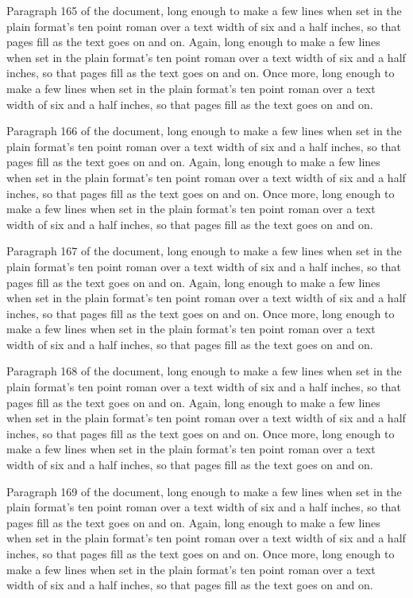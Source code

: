 Paragraph 165 of the document, long enough to make a few lines when set in the plain format's ten point roman over a text width of six and a half inches, so that pages fill as the text goes on and on. Again, long enough to make a few lines when set in the plain format's ten point roman over a text width of six and a half inches, so that pages fill as the text goes on and on. Once more, long enough to make a few lines when set in the plain format's ten point roman over a text width of six and a half inches, so that pages fill as the text goes on and on.

Paragraph 166 of the document, long enough to make a few lines when set in the plain format's ten point roman over a text width of six and a half inches, so that pages fill as the text goes on and on. Again, long enough to make a few lines when set in the plain format's ten point roman over a text width of six and a half inches, so that pages fill as the text goes on and on. Once more, long enough to make a few lines when set in the plain format's ten point roman over a text width of six and a half inches, so that pages fill as the text goes on and on.

Paragraph 167 of the document, long enough to make a few lines when set in the plain format's ten point roman over a text width of six and a half inches, so that pages fill as the text goes on and on. Again, long enough to make a few lines when set in the plain format's ten point roman over a text width of six and a half inches, so that pages fill as the text goes on and on. Once more, long enough to make a few lines when set in the plain format's ten point roman over a text width of six and a half inches, so that pages fill as the text goes on and on.

Paragraph 168 of the document, long enough to make a few lines when set in the plain format's ten point roman over a text width of six and a half inches, so that pages fill as the text goes on and on. Again, long enough to make a few lines when set in the plain format's ten point roman over a text width of six and a half inches, so that pages fill as the text goes on and on. Once more, long enough to make a few lines when set in the plain format's ten point roman over a text width of six and a half inches, so that pages fill as the text goes on and on.

Paragraph 169 of the document, long enough to make a few lines when set in the plain format's ten point roman over a text width of six and a half inches, so that pages fill as the text goes on and on. Again, long enough to make a few lines when set in the plain format's ten point roman over a text width of six and a half inches, so that pages fill as the text goes on and on. Once more, long enough to make a few lines when set in the plain format's ten point roman over a text width of six and a half inches, so that pages fill as the text goes on and on.

